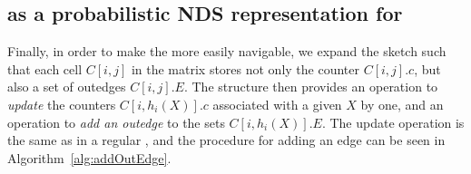 


\subsection{\cm as a probabilistic NDS representation for }
\label{subsubsec:cm-dbg}

Finally, in order to make the \cm more easily navigable, we expand the sketch such that each cell $C[i,j]$ in the matrix stores not only the counter $C[i,j].c$, but also a set of outedges $C[i,j].E$. The structure then provides an operation to \emph{update} the counters $C[i,h_i(X)].c$ associated with a given \kmer $X$ by one, and an operation to \emph{add an outedge} to the sets $C[i,h_i(X)].E$. The update operation is the same as in a regular \cm, and the procedure for adding an edge can be seen in Algorithm~\ref{alg:addOutEdge}.


